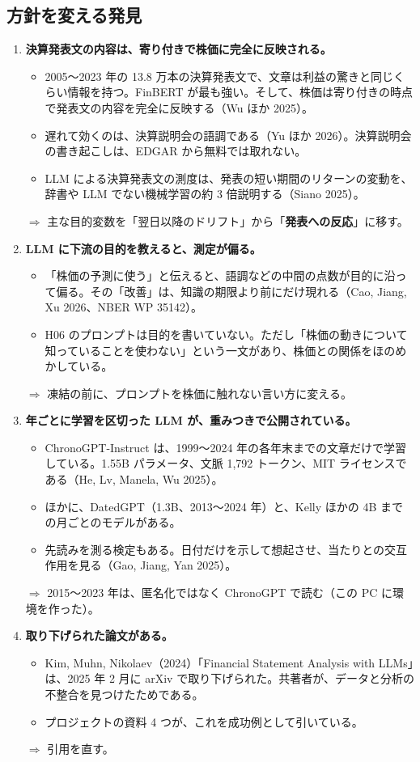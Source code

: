 \documentclass[xelatex,ja=standard,jafont=haranoaji,a4paper,10pt]{bxjsarticle}
\begin{document}
\subsection{方針を変える発見}

\begin{enumerate}
\item \textbf{決算発表文の内容は、寄り付きで株価に完全に反映される。}
  \begin{itemize}
  \item 2005〜2023 年の 13.8 万本の決算発表文で、文章は利益の驚きと同じくらい情報を持つ。FinBERT が最も強い。そして、株価は寄り付きの時点で発表文の内容を完全に反映する（Wu ほか 2025）。
  \item 遅れて効くのは、決算説明会の語調である（Yu ほか 2026）。決算説明会の書き起こしは、EDGAR から無料では取れない。
  \item LLM による決算発表文の測度は、発表の短い期間のリターンの変動を、辞書や LLM でない機械学習の約 3 倍説明する（Siano 2025）。
  \end{itemize}
  $\Rightarrow$ 主な目的変数を「翌日以降のドリフト」から「\textbf{発表への反応}」に移す。
\item \textbf{LLM に下流の目的を教えると、測定が偏る。}
  \begin{itemize}
  \item 「株価の予測に使う」と伝えると、語調などの中間の点数が目的に沿って偏る。その「改善」は、知識の期限より前にだけ現れる（Cao, Jiang, Xu 2026、NBER WP 35142）。
  \item H06 のプロンプトは目的を書いていない。ただし「株価の動きについて知っていることを使わない」という一文があり、株価との関係をほのめかしている。
  \end{itemize}
  $\Rightarrow$ 凍結の前に、プロンプトを株価に触れない言い方に変える。
\item \textbf{年ごとに学習を区切った LLM が、重みつきで公開されている。}
  \begin{itemize}
  \item ChronoGPT-Instruct は、1999〜2024 年の各年末までの文章だけで学習している。1.55B パラメータ、文脈 1,792 トークン、MIT ライセンスである（He, Lv, Manela, Wu 2025）。
  \item ほかに、DatedGPT（1.3B、2013〜2024 年）と、Kelly ほかの 4B までの月ごとのモデルがある。
  \item 先読みを測る検定もある。日付だけを示して想起させ、当たりとの交互作用を見る（Gao, Jiang, Yan 2025）。
  \end{itemize}
  $\Rightarrow$ 2015〜2023 年は、匿名化ではなく ChronoGPT で読む（この PC に環境を作った）。
\item \textbf{取り下げられた論文がある。}
  \begin{itemize}
  \item Kim, Muhn, Nikolaev（2024）「Financial Statement Analysis with LLMs」は、2025 年 2 月に arXiv で取り下げられた。共著者が、データと分析の不整合を見つけたためである。
  \item プロジェクトの資料 4 つが、これを成功例として引いている。
  \end{itemize}
  $\Rightarrow$ 引用を直す。
\end{enumerate}
\end{document}
